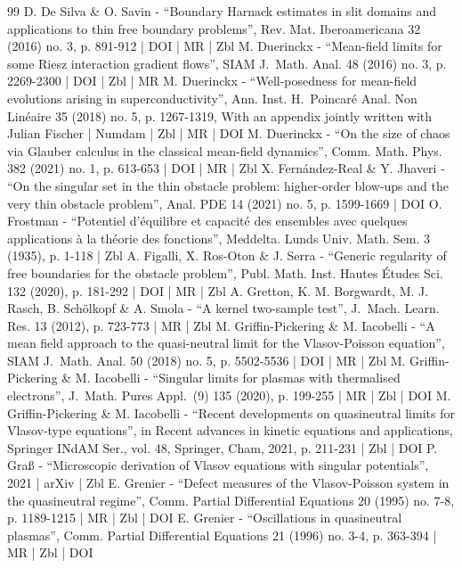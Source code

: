 \begin{thebibliography}{99}
D. De Silva \& O. Savin - “Boundary Harnack estimates in slit domains and applications to thin free boundary problems”, Rev. Mat. Iberoamericana 32 (2016) no. 3, p. 891-912 | DOI | MR | Zbl
M. Duerinckx - “Mean-field limits for some Riesz interaction gradient flows”, SIAM J. Math. Anal. 48 (2016) no. 3, p. 2269-2300 | DOI | Zbl | MR
M. Duerinckx - “Well-posedness for mean-field evolutions arising in superconductivity”, Ann. Inst. H. Poincaré Anal. Non Linéaire 35 (2018) no. 5, p. 1267-1319, With an appendix jointly written with Julian Fischer | Numdam | Zbl | MR | DOI
M. Duerinckx - “On the size of chaos via Glauber calculus in the classical mean-field dynamics”, Comm. Math. Phys. 382 (2021) no. 1, p. 613-653 | DOI | MR | Zbl
X. Fernández-Real \& Y. Jhaveri - “On the singular set in the thin obstacle problem: higher-order blow-ups and the very thin obstacle problem”, Anal. PDE 14 (2021) no. 5, p. 1599-1669 | DOI
O. Frostman - “Potentiel d’équilibre et capacité des ensembles avec quelques applications à la théorie des fonctions”, Meddelta. Lunds Univ. Math. Sem. 3 (1935), p. 1-118 | Zbl
A. Figalli, X. Ros-Oton \& J. Serra - “Generic regularity of free boundaries for the obstacle problem”, Publ. Math. Inst. Hautes Études Sci. 132 (2020), p. 181-292 | DOI | MR | Zbl
A. Gretton, K. M. Borgwardt, M. J. Rasch, B. Schölkopf \& A. Smola - “A kernel two-sample test”, J. Mach. Learn. Res. 13 (2012), p. 723-773 | MR | Zbl
M. Griffin-Pickering \& M. Iacobelli - “A mean field approach to the quasi-neutral limit for the Vlasov-Poisson equation”, SIAM J. Math. Anal. 50 (2018) no. 5, p. 5502-5536 | DOI | MR | Zbl
M. Griffin-Pickering \& M. Iacobelli - “Singular limits for plasmas with thermalised electrons”, J. Math. Pures Appl. (9) 135 (2020), p. 199-255 | MR | Zbl | DOI
M. Griffin-Pickering \& M. Iacobelli - “Recent developments on quasineutral limits for Vlasov-type equations”, in Recent advances in kinetic equations and applications, Springer INdAM Ser., vol. 48, Springer, Cham, 2021, p. 211-231 | Zbl | DOI
P. Graß - “Microscopic derivation of Vlasov equations with singular potentials”, 2021 | arXiv | Zbl
E. Grenier - “Defect measures of the Vlasov-Poisson system in the quasineutral regime”, Comm. Partial Differential Equations 20 (1995) no. 7-8, p. 1189-1215 | MR | Zbl | DOI
E. Grenier - “Oscillations in quasineutral plasmas”, Comm. Partial Differential Equations 21 (1996) no. 3-4, p. 363-394 | MR | Zbl | DOI

\end{thebibliography}
